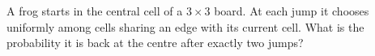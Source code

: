 A frog starts in the central cell of a $3\times3$ board. At each jump it chooses uniformly among cells sharing an edge with its current cell. What is the probability it is back at the centre after exactly two jumps?
